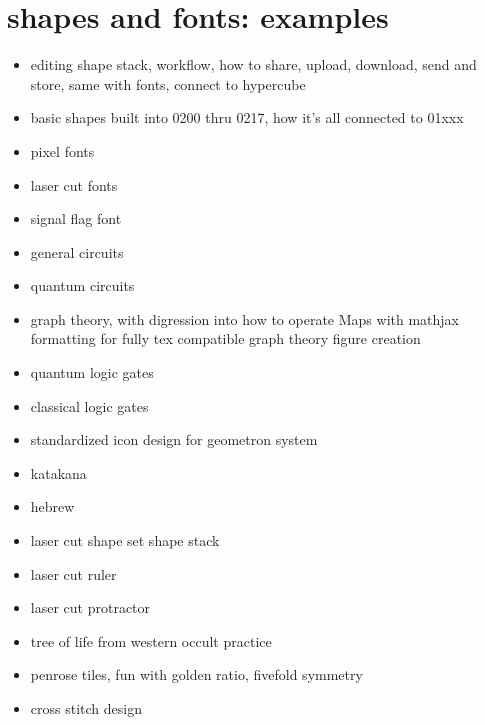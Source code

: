 \section{shapes and fonts: examples}
\begin{itemize}
\tightlist
\item
editing shape stack, workflow, how to share, upload, download, send and store, same with fonts, connect to hypercube
\item
basic shapes built into 0200 thru 0217, how it's all connected to 01xxx
\item
pixel fonts
\item
laser cut fonts
\item
signal flag font
\item
general circuits
\item
quantum circuits
\item
graph theory, with digression into how to operate Maps with mathjax formatting for fully tex compatible graph theory figure creation
\item
quantum logic gates
\item 
classical logic gates
\item
standardized icon design for geometron system
\item
katakana
\item
hebrew
\item
laser cut shape set shape stack
\item
laser cut ruler
\item
laser cut protractor
\item
tree of life from western occult practice
\item
penrose tiles, fun with golden ratio, fivefold symmetry
\item
cross stitch design
\end{itemize}